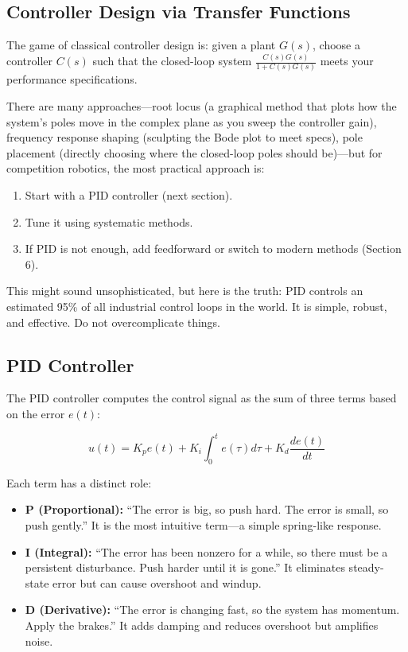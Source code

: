 \subsection{Controller Design via Transfer Functions}

The game of classical controller design is: given a plant $G(s)$, choose a controller $C(s)$ such that the closed-loop system $\frac{C(s)G(s)}{1+C(s)G(s)}$ meets your performance specifications.

There are many approaches---root locus (a graphical method that plots how the system's poles move in the complex plane as you sweep the controller gain), frequency response shaping (sculpting the Bode plot to meet specs), pole placement (directly choosing where the closed-loop poles should be)---but for competition robotics, the most practical approach is:

\begin{enumerate}
    \item Start with a PID controller (next section).
    \item Tune it using systematic methods.
    \item If PID is not enough, add feedforward or switch to modern methods (Section 6).
\end{enumerate}

This might sound unsophisticated, but here is the truth: PID controls an estimated 95\% of all industrial control loops in the world. It is simple, robust, and effective. Do not overcomplicate things.

\subsection{PID Controller}

The PID controller computes the control signal as the sum of three terms based on the error $e(t)$:

\begin{equation}
u(t) = K_p e(t) + K_i \int_0^t e(\tau) d\tau + K_d \frac{de(t)}{dt}
\end{equation}

Each term has a distinct role:

\begin{itemize}
    \item \textbf{P (Proportional):} ``The error is big, so push hard. The error is small, so push gently.'' It is the most intuitive term---a simple spring-like response.
    \item \textbf{I (Integral):} ``The error has been nonzero for a while, so there must be a persistent disturbance. Push harder until it is gone.'' It eliminates steady-state error but can cause overshoot and windup.
    \item \textbf{D (Derivative):} ``The error is changing fast, so the system has momentum. Apply the brakes.'' It adds damping and reduces overshoot but amplifies noise.
\end{itemize}

